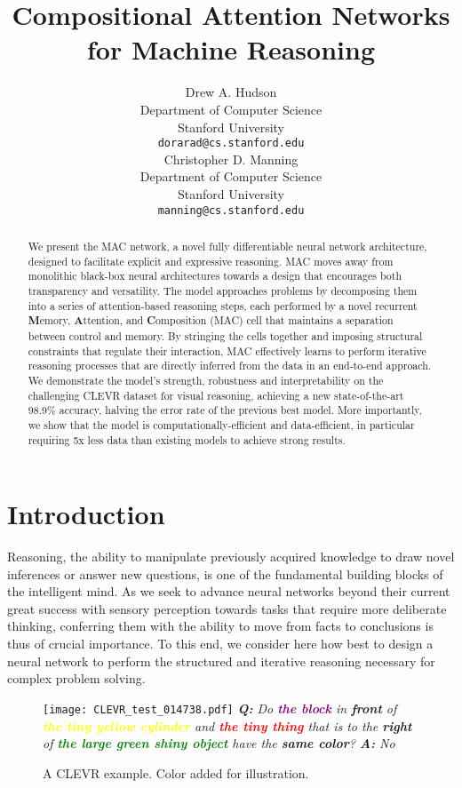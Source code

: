 \documentclass[fleqn]{article}
\title{Compositional Attention Networks \\ for Machine Reasoning}
\author{Drew A. Hudson \\
Department of Computer Science\\
Stanford University\\
\texttt{dorarad@cs.stanford.edu} \\
\And
Christopher D. Manning \\
Department of Computer Science\\
Stanford University\\
\texttt{manning@cs.stanford.edu} \\
}
\begin{document}
\maketitle

\begin{abstract}
We present the MAC network, a novel fully differentiable neural network architecture, designed to facilitate explicit and expressive reasoning. MAC moves away from monolithic black-box neural architectures towards a design that encourages both transparency and versatility. The model approaches problems by decomposing them into a series of attention-based reasoning steps, each performed by a novel recurrent \textbf{M}emory, \textbf{A}ttention, and \textbf{C}omposition (MAC) cell that maintains a separation between control and memory. By stringing the cells together and imposing structural constraints that regulate their interaction, MAC effectively learns to perform iterative reasoning processes that are directly inferred from the data in an end-to-end approach. We demonstrate the model's strength, robustness and interpretability on the challenging CLEVR dataset for visual reasoning, achieving a new state-of-the-art 98.9\% accuracy, halving the error rate of the previous best model. More importantly, we show that the model is computationally-efficient and data-efficient, in particular requiring 5x less data than existing models to achieve strong results. 
\end{abstract} 
\setlength{\textfloatsep}{12pt}

\section{Introduction}
Reasoning, the ability to manipulate previously acquired knowledge to draw novel inferences or answer new questions, is one of the fundamental building blocks of the intelligent mind. As we seek to advance neural networks beyond their current great success with sensory perception  towards tasks that require more deliberate thinking, conferring them with the ability to move from facts to conclusions is thus of crucial importance. To this end, we consider here how best to design a neural network to perform the structured and iterative reasoning necessary for complex problem solving.

\begin{wrapfigure}[14]{r}{0.28\textwidth}
{
\centering
\vspace{-4mm}
\texttt{[image: CLEVR\_test\_014738.pdf]}
}
\footnotesize 
\textit{
{{\normalfont\textbf{Q:}} Do \textbf{\textcolor{purple}{the block}} in \textbf{front} of \textbf{\textcolor{yellow}{the tiny yellow cylinder}} and \textbf{\textcolor{red}{the tiny thing}} that is to the \textbf{right} of \textbf{\textcolor{green}{the large green shiny object}} have the \textbf{same color}? {\normalfont\textbf{A:}} No}
}
\vspace*{-1mm}
\caption{A CLEVR example. Color added for illustration.} 
\label{fig:clevrPhoto}
\end{wrapfigure}
\end{document}
